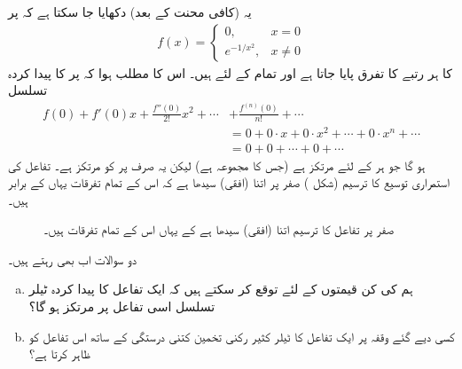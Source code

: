 \quad {}

یہ (کافی محنت کے بعد) دکھایا جا سکتا ہے کہ  پر
 \begin{align*}
f(x)=
\begin{cases}
0,&x=0\\
e^{-1/x^2},&x\ne 0
\end{cases}
\end{align*}
کا ہر رتبے کا تفرق پایا جاتا ہے اور تمام  کے لئے  ہیں۔ اس کا مطلب ہوا کہ  پر  کا پیدا کردہ تسلسل
\begin{align*}
f(0)+f'(0)x+\frac{f''(0)}{2!}x^2+\cdots &+\frac{f^{(n)}(0)}{n!}+\cdots\\
&=0+0\cdot x+0\cdot x^2+\cdots+0\cdot x^n+\cdots\\
&=0+0+\cdots+0+\cdots
\end{align*}
ہو گا جو ہر  کے لئے مرتکز ہے (جس کا مجموعہ  ہے) لیکن یہ صرف  پر  کو مرتکز ہے۔  تفاعل  کی استمراری توسیع کا ترسیم (شکل ) صفر پر اتنا (افقی) سیدھا ہے کہ اس کے تمام تفرقات یہاں  کے برابر ہیں۔
\begin{figure}
\centering
{}
\caption{صفر پر تفاعل کا ترسیم اتنا (افقی) سیدھا ہے  کے یہاں اس کے تمام تفرقات  ہیں۔}
\label{شکل_مثال_تسلسل_مرکوز_لیکن_تفاعل_کو_نہیں}
\end{figure}


دو سوالات اب بھی رہتے ہیں۔
\begin{enumerate}[a.]
\item
ہم  کی کن قیمتوں کے لئے توقع کر سکتے ہیں کہ ایک تفاعل کا پیدا کردہ ٹیلر تسلسل اسی تفاعل پر مرتکز ہو گا؟
\item
کسی دیے گئے وقفہ پر ایک تفاعل  کا ٹیلر کثیر رکنی تخمین کتنی درستگی کے ساتھ اس تفاعل کو ظاہر کرتا ہے؟
\end{enumerate} 

